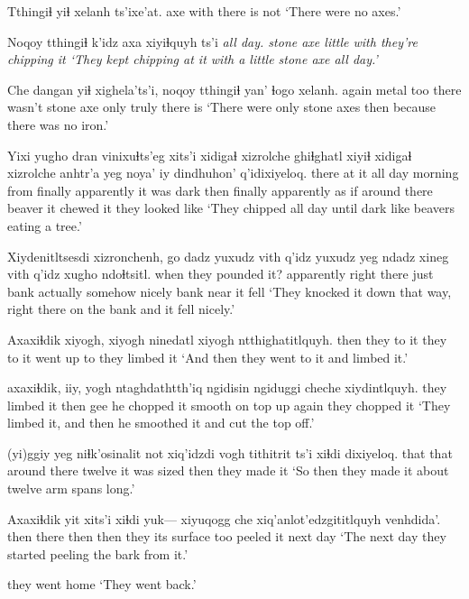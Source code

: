 \documentclass[12pt]{article}
\begin{document}
\gll Tthingiɬ yiɬ xelanh ts'ixe'at. 
axe with {there is} not
\glt `There were no axes.'
\glend

\gll Noqoy tthingiɬ k'idz axa xiyiɬquyh ts'i \em {all day. }
stone axe little with {they're chipping it} {}
\glt `They kept chipping at it with a little stone axe all day.' 
\glend

\gll Che dangan yiɬ xighela'ts'i, noqoy tthingiɬ yan' ɬogo xelanh. 
again metal too {there wasn't} stone axe only truly {there is}
\glt `There were only stone axes then because there was no iron.'
\glend

\gll Yixi yugho dran vinixuɬts'eg xits'i xidigaɬ xizrolche ghiɬghatl xiyiɬ xidigaɬ xizrolche anhtr'a yeg noya' iy dindhuhon' q'idixiyeloq.
there {at it} {all day} morning from finally apparently {it was dark} then finally apparently {as if} {around there} beaver it {chewed it} {they looked like}
\glt `They chipped all day until dark like beavers eating a tree.'
\glend

\gll Xiydenitltsesdi xizronchenh, {go dadz} yuxudz {vith q'idz} {yuxudz yeg} ndadz xineg {vith q'idz} xugho ndoɬtsitl.
{when they pounded it?} apparently {right there} just bank actually somehow nicely bank near {it fell}
\glt `They knocked it down that way, right there on the bank and it fell nicely.' 
\glend

\gll Axaxiɬdik xiyogh, xiyogh ninedatl {xiyogh ntthighatitlquyh.}
then {they to it} {they to it} {went up to} {they limbed it}
\glt `And then they went to it and limbed it.' 
\glend

 axaxiɬdik, iiy, {yogh ntaghdathtth'iq} ngidisin ngiduggi cheche xiydintlquyh. 
{they limbed it} then gee {he chopped it smooth} {on top} up again {they chopped it}
\glt `They limbed it, and then he smoothed it and cut the top off.' 
\glend

 (yi)ggiy yeg {niɬk'osinalit not xiq'idzdi} {vogh tithitrit} ts'i xiɬdi dixiyeloq. 
that that {around there} {twelve} {it was sized} {} then {they made it}
\glt `So then they made it about twelve arm spans long.'
\glend

\gll Axaxiɬdik yit xits'i xiɬdi yuk--- xiyuqogg che xiq'anlot'edzgititlquyh venhdida'. 
then there then then {} {they its surface} too {peeled it} {next day}
\glt `The next day they started peeling the bark from it.'
\glend

{{they went home}}
\glt `They went back.'
\glend
\end{document}
